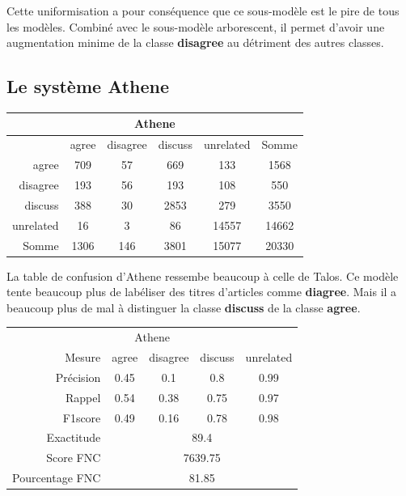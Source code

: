 \documentclass[11pt,a4paper,oldfontcommands]{memoir}
\begin{document}
Cette uniformisation a pour conséquence que ce sous-modèle est le pire de tous les modèles. Combiné avec le sous-modèle arborescent, il permet d'avoir une augmentation minime de la classe \textbf{disagree} au détriment des autres classes.

\subsection{Le système Athene}


\begin{center}
 \begin{tabular}{ r | c c c c | c }
  \multicolumn{6}{c}{Athene}                                 \\
  \hline
            & agree & disagree & discuss & unrelated & Somme \\
  \hline
  agree     & 709   & 57       & 669     & 133       & 1568  \\
  disagree  & 193   & 56       & 193     & 108       & 550   \\
  discuss   & 388   & 30       & 2853    & 279       & 3550  \\
  unrelated & 16    & 3        & 86      & 14557     & 14662 \\
  \hline
  Somme     & 1306  & 146      & 3801    & 15077     & 20330 \\
 \end{tabular}
\end{center}



La table de confusion d'Athene ressembe beaucoup à celle de Talos. Ce modèle tente beaucoup plus de labéliser des titres d'articles comme \textbf{diagree}. Mais il a beaucoup plus de mal à distinguer la classe \textbf{discuss} de la classe \textbf{agree}.

\begin{center}
 \begin{tabular}{ r | c c c c }
  \multicolumn{5}{c}{Athene}                                                     \\
  Mesure          & agree                       & disagree & discuss & unrelated \\
  \hline
  Précision       & 0.45                        & 0.1      & 0.8     & 0.99      \\
  Rappel          & 0.54                        & 0.38     & 0.75    & 0.97      \\
  F1score         & 0.49                        & 0.16     & 0.78    & 0.98      \\
  \hline
  \hline
  Exactitude      & \multicolumn{4}{c}{89.4}                                     \\
  Score FNC       & \multicolumn{4}{c}{7639.75}                                  \\
  Pourcentage FNC & \multicolumn{4}{c}{81.85}                                    \\
 \end{tabular}
\end{center}
\end{document}
